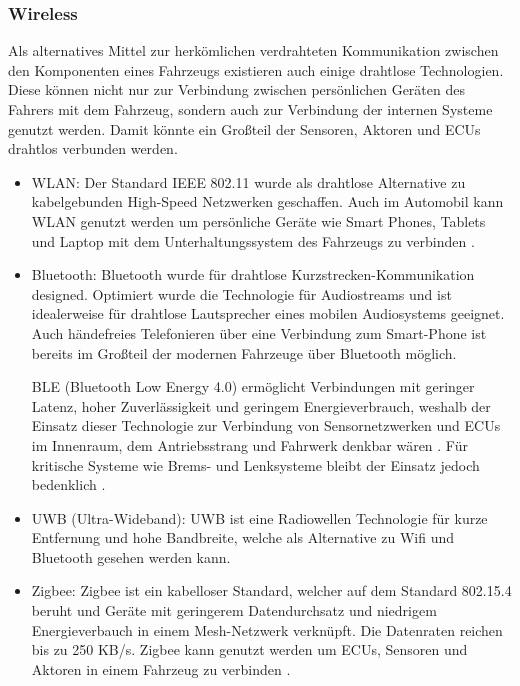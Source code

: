         \subsubsection{Wireless}
        Als alternatives Mittel zur herkömlichen verdrahteten Kommunikation zwischen den Komponenten eines Fahrzeugs existieren auch einige drahtlose Technologien.
        Diese können nicht nur zur Verbindung zwischen persönlichen Geräten des Fahrers mit dem Fahrzeug, sondern auch zur Verbindung der internen Systeme genutzt werden.
        Damit könnte ein Großteil der Sensoren, Aktoren und ECUs drahtlos verbunden werden.
            \begin{itemize}
                \item WLAN: Der Standard IEEE 802.11 wurde als drahtlose Alternative zu kabelgebunden High-Speed
                Netzwerken geschaffen. Auch im Automobil kann WLAN genutzt werden um persönliche Geräte wie Smart Phones,
                Tablets und Laptop mit dem Unterhaltungssystem des Fahrzeugs zu verbinden \cite{TW_huang2018vehicle}. 
                \item Bluetooth: Bluetooth wurde für drahtlose Kurzstrecken-Kommunikation designed. Optimiert wurde die
                Technologie für Audiostreams und ist idealerweise für drahtlose Lautsprecher eines mobilen Audiosystems geeignet.
                Auch händefreies Telefonieren über eine Verbindung zum Smart-Phone ist bereits im Großteil der modernen Fahrzeuge 
                über Bluetooth möglich.
                
                BLE (Bluetooth Low Energy 4.0) ermöglicht Verbindungen mit geringer Latenz, hoher Zuverlässigkeit
                und geringem Energieverbrauch, weshalb der Einsatz dieser Technologie zur Verbindung von Sensornetzwerken und ECUs im Innenraum, 
                dem Antriebsstrang und Fahrwerk denkbar wären \cite{TW_huang2018vehicle}. Für kritische Systeme wie Brems- und Lenksysteme bleibt der Einsatz jedoch bedenklich \cite{wolf2004security}.
                \item UWB (Ultra-Wideband): UWB ist eine Radiowellen Technologie für kurze Entfernung und hohe Bandbreite, welche als Alternative zu Wifi und Bluetooth gesehen werden kann.
                \item Zigbee: Zigbee ist ein kabelloser Standard, welcher auf dem Standard 802.15.4 beruht und Geräte mit geringerem Datendurchsatz und niedrigem Energieverbauch in einem 
                Mesh-Netzwerk verknüpft. Die Datenraten reichen bis zu 250 KB/s. Zigbee kann genutzt werden um ECUs, Sensoren und Aktoren in einem Fahrzeug zu verbinden \cite{TW_huang2018vehicle}.
            \end{itemize}
